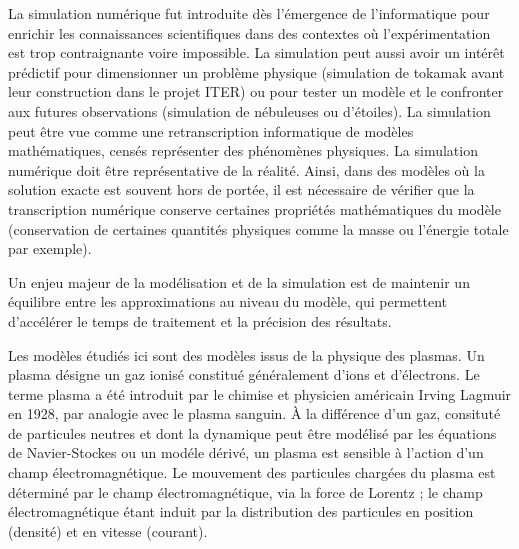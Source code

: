 
La simulation numérique fut introduite dès l’émergence de l’informatique pour enrichir les connaissances scientifiques dans des contextes où l’expérimentation est trop contraignante voire impossible. La simulation peut aussi avoir un intérêt prédictif pour dimensionner un problème physique (simulation de tokamak avant leur construction dans le projet ITER) ou pour tester un modèle et le confronter aux futures observations (simulation de nébuleuses ou d’étoiles). La simulation peut être vue comme une retranscription informatique de modèles mathématiques, censés représenter des phénomènes physiques. La simulation numérique doit être représentative de la réalité. Ainsi, dans des modèles où la solution exacte est souvent hors de portée, il est nécessaire de vérifier que la transcription numérique conserve certaines propriétés mathématiques du modèle (conservation de certaines quantités physiques comme la masse ou l’énergie totale par exemple).

Un enjeu majeur de la modélisation et de la simulation est de maintenir un équilibre entre les approximations au niveau du modèle, qui permettent d’accélérer le temps de traitement et la précision des résultats.

Les modèles étudiés ici sont des modèles issus de la physique des plasmas. Un plasma désigne un gaz ionisé constitué généralement d'ions et d'électrons. Le terme plasma a été introduit par le chimise et physicien américain Irving Lagmuir en 1928, par analogie avec le plasma sanguin. À la différence d'un gaz, consituté de particules neutres et dont la dynamique peut être modélisé par les équations de Navier-Stockes ou un modéle dérivé, un plasma est sensible à l'action d'un champ électromagnétique. Le mouvement des particules chargées du plasma est déterminé par le champ électromagnétique, via la force de Lorentz ; le champ électromagnétique étant induit par la distribution des particules en position (densité) et en vitesse (courant).

